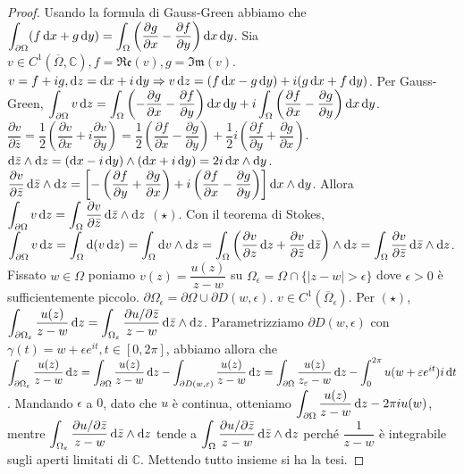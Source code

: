 \begin{proof}
  Usando la formula di Gauss-Green abbiamo che $\displaystyle \int_{\partial \Omega}(f\mathop{}\!\mathrm{d} x+g\mathop{}\!\mathrm{d} y)=\int_{\Omega}\left(\dfrac{\partial g}{\partial x}-\dfrac{\partial f}{\partial y}\right)\mathop{}\!\mathrm{d} x\mathop{}\!\mathrm{d} y$. Sia $v \in C^1(\overline{\Omega}, \mathbb{C}), f=\mathfrak{Re}(v), g=\mathfrak{Im}(v)$.
  $v=f+ig, \diff z=\diff x+i\diff y \implies v\diff z=(f\diff x-g\diff y)+i(g\diff x+f\diff y)$.
  Per Gauss-Green, $\displaystyle \int_{\partial \Omega} v\mathop{}\!\mathrm{d} z=\int_{\Omega} \left(-\dfrac{\partial g}{\partial x}-\dfrac{\partial f}{\partial y}\right)\mathop{}\!\mathrm{d} x\mathop{}\!\mathrm{d} y+i\int_{\Omega} \left(\dfrac{\partial f}{\partial x}-\dfrac{\partial g}{\partial y}\right)\mathop{}\!\mathrm{d} x\mathop{}\!\mathrm{d} y$.
  $\dfrac{\partial v}{\partial\bar{z}}=\dfrac{1}{2}\left(\dfrac{\partial v}{\partial x}+i\dfrac{\partial v}{\partial y}\right)=\dfrac{1}{2}\left(\dfrac{\partial f}{\partial x}-\dfrac{\partial g}{\partial y}\right)+\dfrac{1}{2}i\left(\dfrac{\partial f}{\partial y}+\dfrac{\partial g}{\partial x}\right)$.
  $\diff \bar{z}\wedge\diff z=(\diff x-i\diff y)\wedge(\diff x+i\diff y)=2i\diff x\wedge\diff y$.
  $\dfrac{\partial v}{\partial\bar{z}}\mathop{}\!\mathrm{d}\bar{z}\wedge \mathop{}\!\mathrm{d} z=\left[-\left(\dfrac{\partial f}{\partial y}+\dfrac{\partial g}{\partial x}\right)+i\left(\dfrac{\partial f}{\partial x}-\dfrac{\partial g}{\partial y}\right)\right]\mathop{}\!\mathrm{d} x\wedge\mathop{}\!\mathrm{d} y$.
  Allora $\displaystyle \int_{\partial \Omega}v\mathop{}\!\mathrm{d} z=\int_{\Omega} \dfrac{\partial v}{\partial\bar{z}}\mathop{}\!\mathrm{d}\bar{z}\wedge\mathop{}\!\mathrm{d} z$ $(\star)$.
  Con il teorema di Stokes, $\displaystyle \int_{\partial \Omega}v\diff z=\int_{\Omega} \diff(v\diff z)=\int_{\Omega} \diff v\wedge\diff z=\int_{\Omega} \left(\dfrac{\partial v}{\partial z}\diff z+\dfrac{\partial v}{\partial\bar{z}}\diff\bar{z}\right)\wedge\diff z=\int_{\Omega} \dfrac{\partial v}{\partial\bar{z}} \diff \bar{z}\wedge\diff z$.
  Fissato $w \in \Omega$ poniamo $v(z)=\dfrac{u(z)}{z-w}$ su $\Omega_{\epsilon}=\Omega \cap \{|z-w|>\epsilon\}$ dove $\epsilon>0$ è sufficientemente piccolo. $\partial\Omega_{\epsilon}=\partial\Omega\cup\partial D(w, \epsilon)$. $v \in C^1(\overline{\Omega}_{\epsilon})$.
  Per $(\star)$, $\displaystyle \int_{\partial\Omega_{\varepsilon}} \dfrac{u(z)}{z-w}\mathop{}\!\mathrm{d} z=\int_{\Omega_{\varepsilon}} \dfrac{\partial u/\partial\bar{z}}{z-w}\mathop{}\!\mathrm{d}\bar{z}\wedge\mathop{}\!\mathrm{d} z$.
  Parametrizziamo $\partial D(w, \epsilon)$ con $\gamma(t)=w+\epsilon e^{it}, t \in [0, 2\pi]$, abbiamo allora che
  $\displaystyle \int_{\partial\Omega_{\varepsilon}} \dfrac{u(z)}{z-w}\mathop{}\!\mathrm{d} z=\int_{\partial\Omega} \dfrac{u(z)}{z-w}\mathop{}\!\mathrm{d} z-\int_{\partial D(w, \varepsilon)} \dfrac{u(z)}{z-w}\mathop{}\!\mathrm{d} z=\int_{\partial\Omega} \dfrac{u(z)}{z_{\varepsilon}-w}\mathop{}\!\mathrm{d} z-\int_0^{2\pi} u(w+\varepsilon e^{it})i\mathop{}\!\mathrm{d} t$.
  Mandando $\epsilon$ a $0$, dato che $u$ è continua, otteniamo $\displaystyle \int_{\partial\Omega} \dfrac{u(z)}{z-w}\mathop{}\!\mathrm{d} z-2\pi iu(w)$, mentre $\displaystyle \int_{\Omega_{\varepsilon}} \dfrac{\partial u/\partial\bar{z}}{z-w}\mathop{}\!\mathrm{d}\bar{z}\wedge\mathop{}\!\mathrm{d} z$ tende a $\displaystyle \int_{\Omega} \dfrac{\partial u/\partial\bar{z}}{z-w}\mathop{}\!\mathrm{d}\bar{z}\wedge\mathop{}\!\mathrm{d} z$ perché $\dfrac{1}{z-w}$ è integrabile sugli aperti limitati di $\mathbb{C}$. Mettendo tutto insieme si ha la tesi.
\end{proof}

